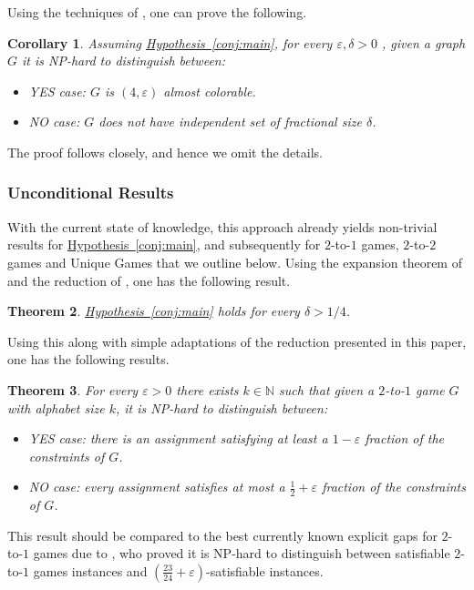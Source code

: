 \documentclass[11pt]{article}
\numberwithin{equation}{section}
\newtheorem{theorem}{Theorem}[section]
\newtheorem{corollary}[theorem]{Corollary}
\theoremstyle{definition}
\theoremstyle{plain}
\newcommand{\expref}[2]{\hyperref[#2]{#1~\ref{#2}}}
\newcommand\eps{\varepsilon}
\begin{document}
Using the techniques of \cite{DKPS}, one can prove the following.
\begin{corollary}
Assuming \expref{Hypothesis}{conj:main},
for every $\eps,\delta>0$ ,
given a graph $G$ it is NP-hard
to distinguish between:
\begin{itemize}
  \item YES case: $G$ is $(4,\eps)$ almost colorable.
  \item NO case: $G$ does not have independent set of fractional size $\delta$.
\end{itemize}
\end{corollary}
The proof follows \cite{DKPS} closely, and hence we omit the details.




\subsubsection*{Unconditional Results}
With the current state of knowledge, this approach already yields non-trivial results for
%
\expref{Hypothesis}{conj:main},  %
and subsequently for $2$-to-$1$ games, $2$-to-$2$ games and Unique Games that we outline below.
Using the expansion theorem of \cite{DKKMSgras} and the reduction of \cite{BKS}, one has the following
result.
%
\begin{theorem}
\expref{Hypothesis}{conj:main} holds for every $\delta>1/4$.
\end{theorem}

Using this along with simple adaptations of the reduction presented in this paper, one has the following results.
\begin{theorem}
For every $\eps>0$ there exists $k\in\mathbb{N}$ such that given a $2$-to-$1$ game $G$ with alphabet size $k$, it
is NP-hard to distinguish between:
\begin{itemize}
  \item YES case: there is an assignment satisfying at least
  a %
   $1-\eps$ fraction of the constraints of $G$.
  \item NO case: every assignment satisfies at most
  a %
  $\frac{1}{2}+\eps$ fraction of the constraints of $G$.
\end{itemize}
\end{theorem}

This result should be compared to the best currently known explicit gaps for $2$-to-$1$ games due to
\cite{AOTW}, who proved it is NP-hard to distinguish between satisfiable $2$-to-$1$ games instances and
$\left(\frac{23}{24}+\eps\right)$-satisfiable instances.
\end{document}
